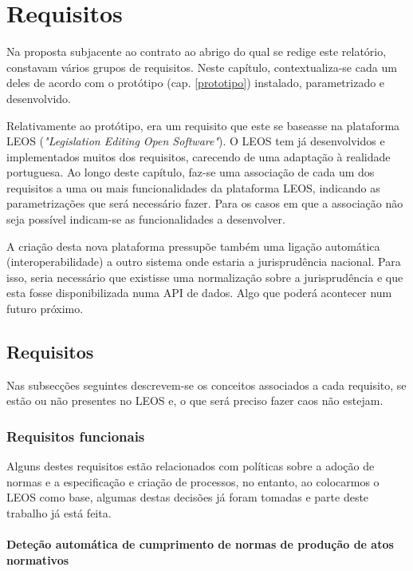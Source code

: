 \chapter{Requisitos}
\label{requisitos}

Na proposta subjacente ao contrato ao abrigo do qual se redige este relatório, constavam vários grupos de requisitos.
Neste capítulo, contextualiza-se cada um deles de acordo com o protótipo (cap. \ref{prototipo}) instalado, parametrizado 
e desenvolvido.

Relativamente ao protótipo, era um requisito que este se baseasse na plataforma LEOS (\emph{"Legislation Editing Open Software"}).
O LEOS tem já desenvolvidos e implementados muitos dos requisitos, carecendo de uma adaptação à realidade portuguesa.
Ao longo deste capítulo, faz-se uma associação de cada um dos requisitos a uma ou mais funcionalidades da plataforma LEOS,
indicando as parametrizações que será necessário fazer. Para os casos em que a associação não seja possível indicam-se as 
funcionalidades a desenvolver.

A criação desta nova plataforma pressupõe também uma ligação automática (interoperabilidade) a outro sistema onde estaria 
a jurisprudência nacional. Para isso, seria necessário que existisse uma normalização sobre a jurisprudência e que esta fosse 
disponibilizada numa API de dados. Algo que poderá acontecer num futuro próximo.

\section{Requisitos}

Nas subsecções seguintes descrevem-se os conceitos associados a cada requisito, se estão ou não presentes no LEOS e,
o que será preciso fazer caos não estejam.

\subsection{Requisitos funcionais}

Alguns destes requisitos estão relacionados com políticas sobre a adoção de normas e a especificação e 
criação de processos, no entanto,
ao colocarmos o LEOS como base, algumas destas decisões já foram tomadas e parte deste trabalho já está feita.

\subsubsection{Deteção automática de cumprimento de normas de produção de atos normativos}

